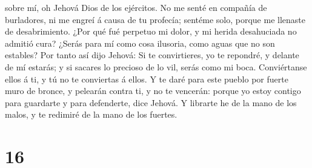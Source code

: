 sobre mí, oh Jehová Dios de los ejércitos.  No me senté
en compañía de burladores, ni me engreí á causa de tu profecía; sentéme
solo, porque me llenaste de desabrimiento.  ¿Por qué fué
perpetuo mi dolor, y mi herida desahuciada no admitió cura? ¿Serás para
mí como cosa ilusoria, como aguas que no son estables? 
Por tanto así dijo Jehová: Si te convirtieres, yo te repondré, y delante
de mí estarás; y si sacares lo precioso de lo vil, serás como mi boca.
Conviértanse ellos á ti, y tú no te conviertas á ellos. 
Y te daré para este pueblo por fuerte muro de bronce, y pelearán contra
ti, y no te vencerán: porque yo estoy contigo para guardarte y para
defenderte, dice Jehová.  Y librarte he de la mano de los
malos, y te redimiré de la mano de los fuertes.

\hypertarget{section-15}{%
\section{16}\label{section-15}}

